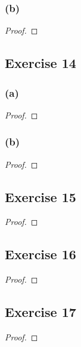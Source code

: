 \documentclass[14pt]{extarticle}
\begin{document}
\subsubsection{(b)}

\begin{proof}

\end{proof}

\subsection{Exercise 14}

\subsubsection{(a)}

\begin{proof}

\end{proof}

\subsubsection{(b)}

\begin{proof}

\end{proof}

\subsection{Exercise 15}

\begin{proof}

\end{proof}

\subsection{Exercise 16}

\begin{proof}

\end{proof}

\subsection{Exercise 17}

\begin{proof}

\end{proof}
\end{document}
